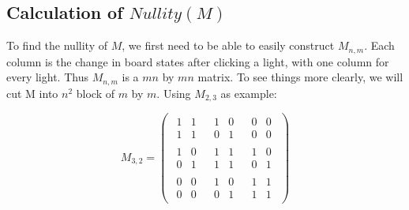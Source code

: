 \documentclass[a4paper, 12pt]{article}
\begin{document}
\subsection{Calculation of \texorpdfstring{$Nullity(M)$}{Nullity(M)}}
To find the nullity of $M$, we first need to be able to easily construct $M_{n, m}$. Each column is the change in board states after clicking a light, with one column for every light. Thus $M_{n, m}$ is a $mn$ by $mn$ matrix. To see things more clearly, we will cut M into $n^2$ block of $m$ by $m$. Using $M_{2, 3}$ as example:
\begin{singlespace}
\begin{equation*}
M_{3,2}=
\left(
\begin{array}{c|c|c}
\begin{matrix}1&1\\1&1\end{matrix}&
\begin{matrix}1&0\\0&1\end{matrix}&
\begin{matrix}0&0\\0&0\end{matrix}\\\hline
\begin{matrix}1&0\\0&1\end{matrix}&
\begin{matrix}1&1\\1&1\end{matrix}&
\begin{matrix}1&0\\0&1\end{matrix}\\\hline
\begin{matrix}0&0\\0&0\end{matrix}&
\begin{matrix}1&0\\0&1\end{matrix}&
\begin{matrix}1&1\\1&1\end{matrix}
\end{array}
\right)
\end{equation*}
\end{singlespace}
\end{document}
